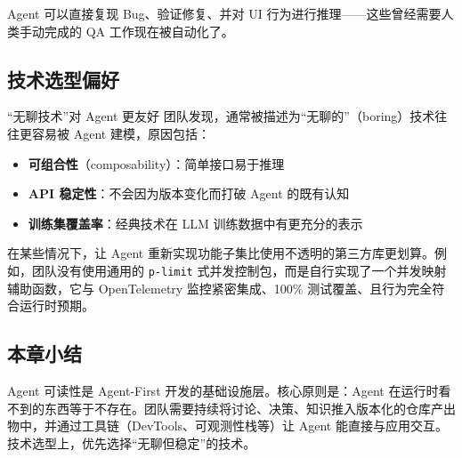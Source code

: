 Agent 可以直接复现 Bug、验证修复、并对 UI 行为进行推理——这些曾经需要人类手动完成的 QA 工作现在被自动化了。

\subsection{技术选型偏好}

\begin{knowledgebox}{``无聊技术''对 Agent 更友好}
团队发现，通常被描述为``无聊的''（boring）技术往往更容易被 Agent 建模，原因包括：
\begin{itemize}[nosep]
  \item \textbf{可组合性}（composability）：简单接口易于推理
  \item \textbf{API 稳定性}：不会因为版本变化而打破 Agent 的既有认知
  \item \textbf{训练集覆盖率}：经典技术在 LLM 训练数据中有更充分的表示
\end{itemize}
在某些情况下，让 Agent 重新实现功能子集比使用不透明的第三方库更划算。例如，团队没有使用通用的 \texttt{p-limit} 式并发控制包，而是自行实现了一个并发映射辅助函数，它与 OpenTelemetry 监控紧密集成、100\% 测试覆盖、且行为完全符合运行时预期。
\end{knowledgebox}

\subsection{本章小结}

Agent 可读性是 Agent-First 开发的基础设施层。核心原则是：Agent 在运行时看不到的东西等于不存在。团队需要持续将讨论、决策、知识推入版本化的仓库产出物中，并通过工具链（DevTools、可观测性栈等）让 Agent 能直接与应用交互。技术选型上，优先选择``无聊但稳定''的技术。

\newpage

